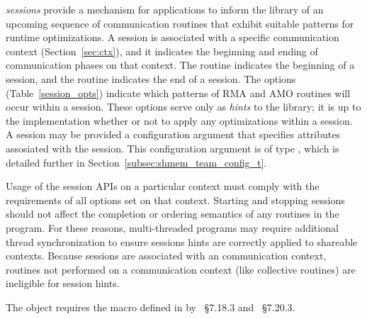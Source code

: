 \openshmem \emph{sessions} provide a mechanism for applications to inform the
\openshmem library of an upcoming sequence of communication routines that
exhibit suitable patterns for runtime optimizations.
A session is associated with a specific \openshmem communication context
(Section~\ref{sec:ctx}), and it indicates the beginning and ending of
communication phases on that context.
The  routine indicates the beginning of a session,
and the  routine indicates the end of a session.
The  options (Table~\ref{session_opts}) indicate
which patterns of \openshmem RMA and AMO routines will occur within a session.
These options serve only as \textit{hints} to the library; it is up to the
implementation whether or not to apply any optimizations within a session.
A session may be provided a configuration argument that specifies attributes
assosiated with the session. This configuration argument is of type
, which is detailed further in
Section~\ref{subsec:shmem_team_config_t}.

Usage of the \openshmem session APIs on a particular context must comply with
the requirements of all options set on that context.
Starting and stopping \openshmem sessions should not affect the completion or
ordering semantics of any \openshmem routines in the program.
For these reasons, multi-threaded \openshmem programs may require additional
thread synchronization to ensure sessions hints are correctly applied to
shareable contexts.
Because sessions are associated with an \openshmem communication context,
routines not performed on a communication context (like collective routines)
are ineligible for session hints.

The  object requires the  macro
defined in  by \Cstd[99]~\S7.18.3 and \Cstd[11]~\S7.20.3.
